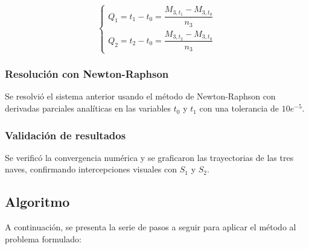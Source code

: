 \begin{equation}
    \begin{cases}
        Q_1 = t_1 - t_0 = \dfrac{M_{3, t_1} - M_{3, t_0}}{n_3} \\
        Q_2 = t_2 - t_0 = \dfrac{M_{3, t_2} - M_{3, t_0}}{n_3}
    \end{cases}
\end{equation}

\subsubsection{Resolución con Newton-Raphson}
Se resolvió el sistema anterior usando el método de Newton-Raphson con
derivadas parciales analíticas en las variables $t_0$ y $t_1$ con una
tolerancia de $10e^{-5}$.

\subsubsection{Validación de resultados}
Se verificó la convergencia numérica y se graficaron las trayectorias de las
tres naves, confirmando intercepciones visuales con $S_1$ y $S_2$.

\subsection{Algoritmo}

A continuación, se presenta la serie de pasos a seguir para aplicar el método
al problema formulado:

